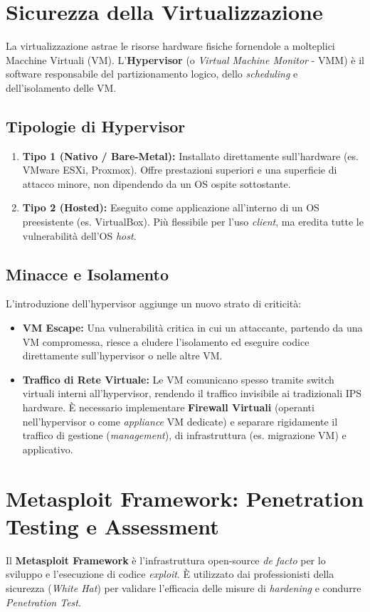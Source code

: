 \section{Sicurezza della Virtualizzazione}
La virtualizzazione astrae le risorse hardware fisiche fornendole a molteplici Macchine Virtuali (VM). L'\textbf{Hypervisor} (o \textit{Virtual Machine Monitor} - VMM) è il software responsabile del partizionamento logico, dello \textit{scheduling} e dell'isolamento delle VM.



\subsection{Tipologie di Hypervisor}
\begin{enumerate}
    \item \textbf{Tipo 1 (Nativo / Bare-Metal):} Installato direttamente sull'hardware (es. VMware ESXi, Proxmox). Offre prestazioni superiori e una superficie di attacco minore, non dipendendo da un OS ospite sottostante.
    \item \textbf{Tipo 2 (Hosted):} Eseguito come applicazione all'interno di un OS preesistente (es. VirtualBox). Più flessibile per l'uso \textit{client}, ma eredita tutte le vulnerabilità dell'OS \textit{host}.
\end{enumerate}

\subsection{Minacce e Isolamento}
L'introduzione dell'hypervisor aggiunge un nuovo strato di criticità:
\begin{itemize}
    \item \textbf{VM Escape:} Una vulnerabilità critica in cui un attaccante, partendo da una VM compromessa, riesce a eludere l'isolamento ed eseguire codice direttamente sull'hypervisor o nelle altre VM.
    \item \textbf{Traffico di Rete Virtuale:} Le VM comunicano spesso tramite switch virtuali interni all'hypervisor, rendendo il traffico invisibile ai tradizionali IPS hardware. È necessario implementare \textbf{Firewall Virtuali} (operanti nell'hypervisor o come \textit{appliance} VM dedicate) e separare rigidamente il traffico di gestione (\textit{management}), di infrastruttura (es. migrazione VM) e applicativo.
\end{itemize}

\section{Metasploit Framework: Penetration Testing e Assessment}
Il \textbf{Metasploit Framework} è l'infrastruttura open-source \textit{de facto} per lo sviluppo e l'esecuzione di codice \textit{exploit}. È utilizzato dai professionisti della sicurezza (\textit{White Hat}) per validare l'efficacia delle misure di \textit{hardening} e condurre \textit{Penetration Test}.



